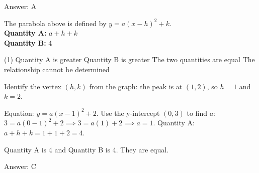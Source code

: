 \documentclass[11pt,paper=a4,answers]{exam}
\begin{document}
\begin{questions}
\begin{solution}
Answer: \colorbox{yellow!100}{A}
\end{solution}

\vspace{1cm}

\question
\begin{center}
\end{center}
The parabola above is defined by $y = a(x-h)^2 + k$.
\vspace{5pt}\\
\textbf{Quantity A: } $a + h + k$ \\
\vspace{5pt}
\textbf{Quantity B: } 4

\begin{tasks}(1)
\task[A)] Quantity A is greater
\task[B)] Quantity B is greater
\task[C)] The two quantities are equal
\task[D)] The relationship cannot be determined
\end{tasks}

\begin{solution}
Identify the vertex $(h, k)$ from the graph: the peak is at $(1, 2)$, so $h = 1$ and $k = 2$.
\vspace{5pt}
\begin{center}
Equation: $y = a(x - 1)^2 + 2$.
\vspace{5pt}
Use the y-intercept $(0, 3)$ to find $a$:
\vspace{5pt}
$3 = a(0 - 1)^2 + 2 \implies 3 = a(1) + 2 \implies a = 1$.
\vspace{10pt}
Quantity A: $a + h + k = 1 + 1 + 2 = 4$.
\end{center}
\vspace{5pt}
Quantity A is 4 and Quantity B is 4. They are equal.

Answer: \colorbox{yellow!100}{C}
\end{solution}

\vspace{1cm}


\end{questions}
\end{document}
